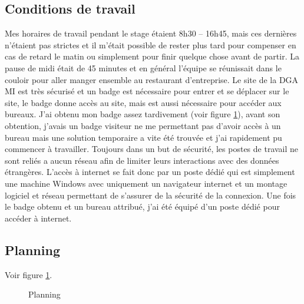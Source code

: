 \documentclass[11pt, book, english, french, standardlists]{upmethodology-document}
\begin{document}
			\subsection{Conditions de travail}
					Mes horaires de travail pendant le stage étaient 8h30 -- 16h45, mais ces dernières n'étaient pas strictes et il m'était possible de rester plus tard pour compenser en cas de retard le matin ou simplement pour finir quelque chose avant de partir. La pause de midi était de 45 minutes et en général l'équipe se réunissait dans le couloir pour aller manger ensemble au restaurant d'entreprise.
					Le site de la \gls{DGA MI} est très sécurisé et un badge est nécessaire pour entrer et se déplacer sur le site, le badge donne accès au site, mais est aussi nécessaire pour accéder aux bureaux. J'ai obtenu mon badge assez tardivement (voir figure \ref{fig:Planning}), avant son obtention, j'avais un badge visiteur ne me permettant pas d'avoir accès à un bureau mais une solution temporaire a vite été trouvée et j'ai rapidement pu commencer à travailler.
					Toujours dans un but de sécurité, les postes de travail ne sont reliés a aucun réseau afin de limiter leurs interactions avec des données étrangères. L'accès à internet se fait donc par un poste dédié qui est simplement une machine Windows avec uniquement un navigateur internet et un montage logiciel et réseau permettant de s'assurer de la sécurité de la connexion. Une fois le badge obtenu et un bureau attribué, j'ai été équipé d'un poste dédié pour accéder à internet.
			\subsection{Planning}
				Voir figure \ref{fig:Planning}.
				\begin{landscape}
					\begin{figure}[H]
						\vspace*{-0.5cm}
						\hspace*{-2cm}
						\centering
						\caption{Planning}
						\label{fig:Planning}
					\end{figure}
				\end{landscape}
\end{document}
